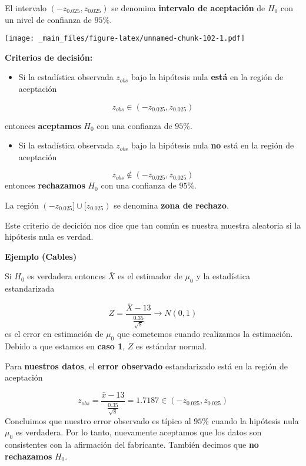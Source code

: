 \documentclass[
]{book}
\providecommand{\tightlist}{%
  \setlength{\itemsep}{0pt}\setlength{\parskip}{0pt}}
\begin{document}
El intervalo \((-z_{0.025}, z_{0.025})\) se denomina \textbf{intervalo de aceptación} de \(H_0\) con un nivel de confianza de \(95\%\).

\texttt{[image: \_main\_files/figure-latex/unnamed-chunk-102-1.pdf]}

\textbf{Criterios de decisión:}

\begin{itemize}
\tightlist
\item
  Si la estadística observada \(z_{obs}\) bajo la hipótesis nula \textbf{está} en la región de aceptación
\end{itemize}

\[z_{obs} \in (-z_{0.025}, z_{0.025})\]

entonces \textbf{aceptamos} \(H_0\) con una confianza de \(95\%\).

\begin{itemize}
\tightlist
\item
  Si la estadística observada \(z_{obs}\) bajo la hipótesis nula \textbf{no} está en la región de aceptación
\end{itemize}

\[z_{obs} \notin (-z_{0.025}, z_{0.025})\] entonces \textbf{rechazamos} \(H_0\) con una confianza de \(95\%\).

La región \((-z_{0.025}] \cup[z_{0.025})\) se denomina \textbf{zona de rechazo}.

Este criterio de decición nos dice que tan común es nuestra muestra aleatoria si la hipótesis nula es verdad.

\textbf{Ejemplo (Cables)}

Si \(H_0\) es verdadera entonces \(\bar{X}\) es el estimador de \(\mu_0\) y la estadística estandarizada

\[Z=\frac{\bar{X}-13}{\frac{0.35}{\sqrt{8}}} \rightarrow N(0,1)\]
es el error en estimación de \(\mu_0\) que cometemos cuando realizamos la estimación. Debido a que estamos en \textbf{caso 1}, \(Z\) es estándar normal.

Para \textbf{nuestros datos}, el \textbf{error observado} estandarizado está en la región de aceptación

\[z_{obs}=\frac{\bar{x}-13}{\frac{0.35}{\sqrt{8}}}=1.7187 \in (-z_{0.025}, z_{0.025})\]
Concluimos que nuestro error observado es típico al \(95\%\) cuando la hipótesis nula \(\mu_0\) es verdadera. Por lo tanto, nuevamente aceptamos que los datos son consistentes con la afirmación del fabricante. También decimos que \textbf{no rechazamos} \(H_0\).
\end{document}
